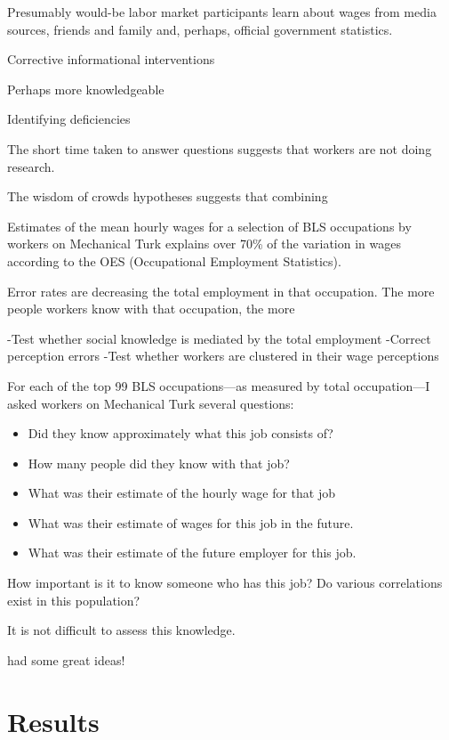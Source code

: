 \documentclass[11pt]{article}
\begin{document}
Presumably would-be labor market participants learn about wages from media sources, friends and family and, perhaps, official government statistics. 

Corrective informational interventions 

Perhaps more knowledgeable 

Identifying deficiencies 

\cite{jensen2010perceived} 

The short time taken to answer questions suggests that workers are not doing research. 

The wisdom of crowds hypotheses suggests that combining 

Estimates of the mean hourly wages for a selection of BLS occupations by workers on Mechanical Turk explains over 70\% of the variation in wages according to the OES (Occupational Employment Statistics).  

Error rates are decreasing the total employment in that occupation. 
The more people workers know with that occupation, the more 

\cite{snowberg2011prediction}
\cite{Kohen1975133} 
\cite{dupas2009teenagers} 

-Test whether social knowledge is mediated by the total employment 
-Correct perception errors 
-Test whether workers are clustered in their wage perceptions

For each of the top 99 BLS occupations---as measured by total occupation---I asked workers on Mechanical Turk several questions: 
\begin{itemize}
\item Did they know approximately what this job consists of? 
\item How many people did they know with that job? 
\item What was their estimate of the hourly wage for that job 
\item What was their estimate of wages for this job in the future.
\item What was their estimate of the future employer for this job. 
\end{itemize} 


How important is it to know someone who has this job? 
Do various correlations exist in this population? 

It is not difficult to assess this knowledge. 

\cite{smith1999wealth} had some great ideas! 

\section{Results}
\end{document}
